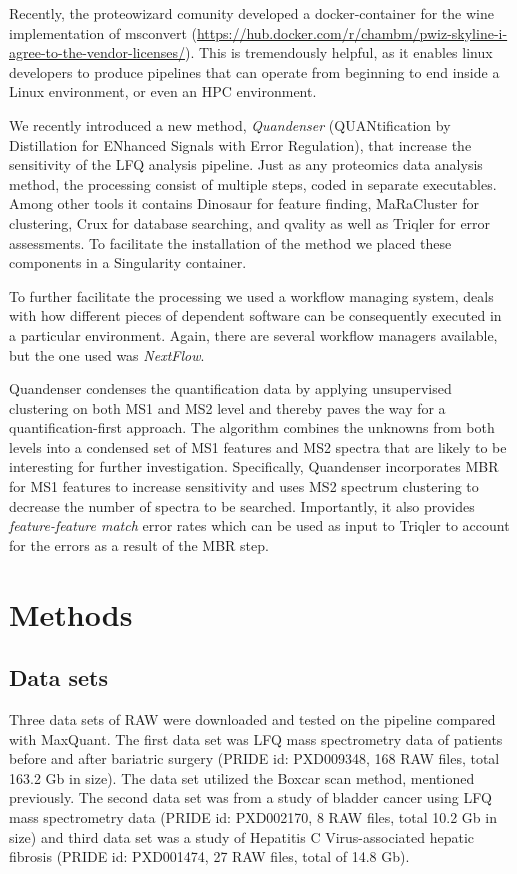 \documentclass[11pt]{article}
\begin{document}
Recently, the proteowizard comunity developed a docker-container for the wine implementation of msconvert (\url{https://hub.docker.com/r/chambm/pwiz-skyline-i-agree-to-the-vendor-licenses/}). This is tremendously helpful, as it enables linux developers to produce pipelines that can operate from beginning to end inside a Linux environment, or even an HPC environment.

We recently introduced a new method, {\em Quandenser} (QUANtification by
Distillation for ENhanced Signals with Error Regulation), that increase the sensitivity of the LFQ
analysis pipeline. Just as any proteomics data analysis method, the processing consist of multiple steps, coded in separate executables. Among other tools it contains Dinosaur\cite{teleman2016dinosaur} for feature finding, MaRaCluster\cite{the2016maracluster} for clustering, Crux\cite{mcilwain2014} for database searching, and qvality\cite{kall2008non} as well as Triqler\cite{the2018integrated} for error assessments. To facilitate the installation of the method we placed these components in a Singularity container.

To further facilitate the processing we used a workflow managing system, deals with how different pieces of dependent software can be consequently executed in a particular environment. Again, there are several workflow managers available, but the one used was \textit{NextFlow}\cite{di2017nextflow}.

Quandenser condenses the quantification data by applying
unsupervised clustering on both MS1 and MS2 level and thereby paves the way for
a quantification-first approach. The algorithm combines the unknowns from both
levels into a condensed set of MS1 features and MS2 spectra that are likely to
be interesting for further investigation. Specifically, Quandenser incorporates
MBR for MS1 features to increase sensitivity and uses MS2 spectrum clustering
to decrease the number of spectra to be searched. Importantly, it also provides
{\em feature-feature match} error rates which can be used as input to Triqler
to account for the errors as a result of the MBR step.

\section*{Methods}

\subsection*{Data sets}
Three data sets of RAW were downloaded and tested on the pipeline compared with MaxQuant. The first data set was LFQ mass spectrometry data of patients before and after bariatric surgery (PRIDE id: PXD009348, 168 RAW files, total 163.2 Gb in size). The data set utilized the Boxcar scan method, mentioned previously. The second data set was from a study of bladder cancer using LFQ mass spectrometry data (PRIDE id: PXD002170, 8 RAW files, total 10.2 Gb in size) and third data set was a study of Hepatitis C Virus-associated hepatic fibrosis (PRIDE id:  PXD001474, 27 RAW files, total of 14.8 Gb).
\end{document}
